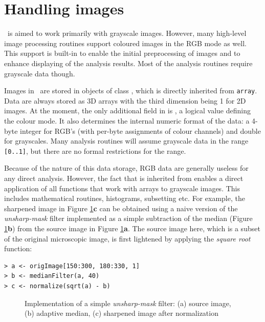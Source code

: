 \section*{Handling images}

\EBImage\ is aimed to work primarily with grayscale images. However, many high-level image processing routines support coloured images in the RGB mode as well. This support is built-in to enable the initial preprocessing of images and to enhance displaying of the analysis results. Most of the analysis routines require grayscale data though.

Images in \EBImage\ are stored in objects of class , which is directly inherited from {\tt array}. Data are always stored as 3D arrays with the third dimension being 1 for 2D images. At the moment, the only additional field in  is , a logical value defining the colour mode. It also determines the internal numeric format of the data: a 4-byte integer for RGB's (with per-byte assignments of colour channels) and double for grayscales. Many analysis routines will assume grayscale data in the range {\tt [0..1]}, but there are no formal restrictions for the range.

Because of the nature of this data storage, RGB data are generally useless for any direct analysis. However, the fact that  is inherited from  enables a direct application of all \R{} functions that work with arrays to grayscale images. This includes mathematical routines, histograms, subsetting etc. For example, the sharpened image in Figure \ref{figure:sharpening}{\bf c} can be obtained using a naive version of the {\em unsharp-mask} filter implemented as a simple subtraction of the median (Figure \ref{figure:sharpening}{\bf b}) from the source image in Figure \ref{figure:sharpening}{\bf a}. The source image here, which is a subset of the original microscopic image, is first lightened by applying the {\em square root} function:

\begin{verbatim}
> a <- origImage[150:300, 180:330, 1]
> b <- medianFilter(a, 40)
> c <- normalize(sqrt(a) - b)
\end{verbatim}

\begin{figure}
\vspace*{.1in}
\begin{center}
\end{center}
\caption{\label{figure:sharpening}
    Implementation of a simple {\em unsharp-mask} filter: (a) source image, (b) adaptive median, (c) sharpened image after normalization
}
\end{figure}


